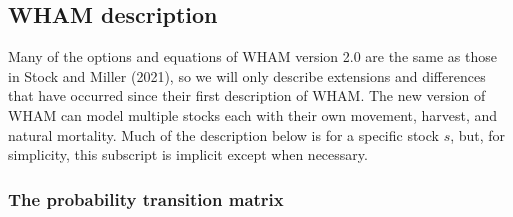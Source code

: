 \documentclass[
]{article}
\begin{document}
\hypertarget{wham-description}{%
\subsection*{WHAM description}\label{wham-description}}

Many of the options and equations of WHAM version 2.0 are the same as
those in Stock and Miller (2021), so we will only describe extensions
and differences that have occurred since their first description of
WHAM. The new version of WHAM can model multiple stocks each with their
own movement, harvest, and natural mortality. Much of the description
below is for a specific stock \(s\), but, for simplicity, this subscript
is implicit except when necessary.

\hypertarget{the-probability-transition-matrix}{%
\subsubsection*{The probability transition
matrix}\label{the-probability-transition-matrix}}
\end{document}
